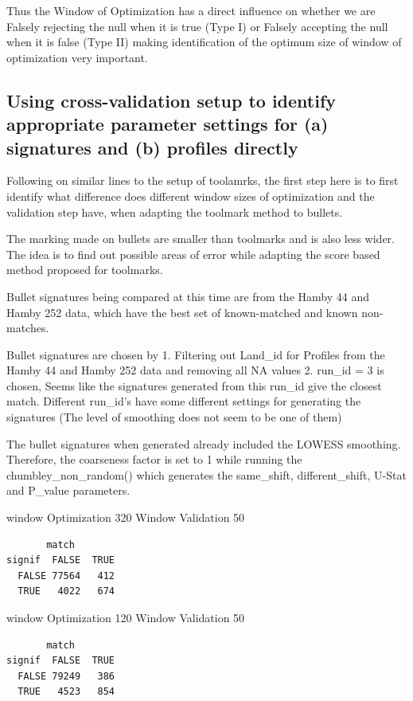 \documentclass[12pt]{article}
\begin{document}
Thus the Window of Optimization has a direct influence on whether we are
Falsely rejecting the null when it is true (Type I) or Falsely accepting
the null when it is false (Type II) making identification of the optimum
size of window of optimization very important.

\subsection{Using cross-validation setup to identify appropriate
parameter settings for (a) signatures and (b) profiles
directly}\label{using-cross-validation-setup-to-identify-appropriate-parameter-settings-for-a-signatures-and-b-profiles-directly}

Following on similar lines to the setup of toolamrks, the first step
here is to first identify what difference does different window sizes of
optimization and the validation step have, when adapting the toolmark
method to bullets.

The marking made on bullets are smaller than toolmarks and is also less
wider. The idea is to find out possible areas of error while adapting
the score based method proposed for toolmarks.

Bullet signatures being compared at this time are from the Hamby 44 and
Hamby 252 data, which have the best set of known-matched and known
non-matches.

Bullet signatures are chosen by 1. Filtering out Land\_id for Profiles
from the Hamby 44 and Hamby 252 data and removing all NA values 2.
run\_id = 3 is chosen, Seems like the signatures generated from this
run\_id give the closest match. Different run\_id's have some different
settings for generating the signatures (The level of smoothing does not
seem to be one of them)

The bullet signatures when generated already included the LOWESS
smoothing. Therefore, the coarseness factor is set to 1 while running
the chumbley\_non\_random() which generates the same\_shift,
different\_shift, U-Stat and P\_value parameters.

window Optimization 320 Window Validation 50

\begin{verbatim}
       match
signif  FALSE  TRUE
  FALSE 77564   412
  TRUE   4022   674
\end{verbatim}

window Optimization 120 Window Validation 50

\begin{verbatim}
       match
signif  FALSE  TRUE
  FALSE 79249   386
  TRUE   4523   854
\end{verbatim}
\end{document}
